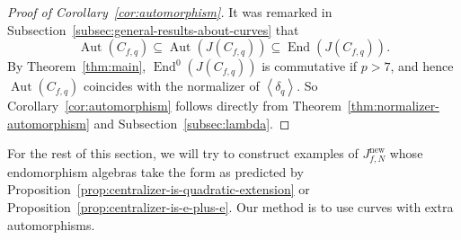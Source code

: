 \documentclass{amsart}[11pt]
\theoremstyle{definition}
\numberwithin{equation}{section}
\theoremstyle{notitle}
\begin{document}
\begin{proof}[Proof of Corollary~\ref{cor:automorphism}]
It was remarked in
Subsection~\ref{subsec:general-results-about-curves} that 
\[ \operatorname{Aut}(C_{f,q})\subseteq \operatorname{Aut}(J(C_{f,q}))
\subseteq \operatorname{End}(J(C_{f,q})). \] By Theorem~\ref{thm:main},
$\operatorname{End}^0(J(C_{f,q}))$ is commutative if $p>7$, and hence $\operatorname{Aut}(C_{f,q})$
coincides with the normalizer of ${\left\langle {\delta_q} \right\rangle}$. So
Corollary~\ref{cor:automorphism} follows directly from
Theorem~\ref{thm:normalizer-automorphism} and
Subsection~\ref{subsec:lambda}. 
\end{proof}

For the rest of this section, we will try to construct examples of
$J_{f,N}^{\mathrm{new}}$ whose endomorphism algebras take the form as predicted
by Proposition~\ref{prop:centralizer-is-quadratic-extension} or
Proposition~\ref{prop:centralizer-is-e-plus-e}. Our  method is to
use curves with extra automorphisms. 
\end{document}
